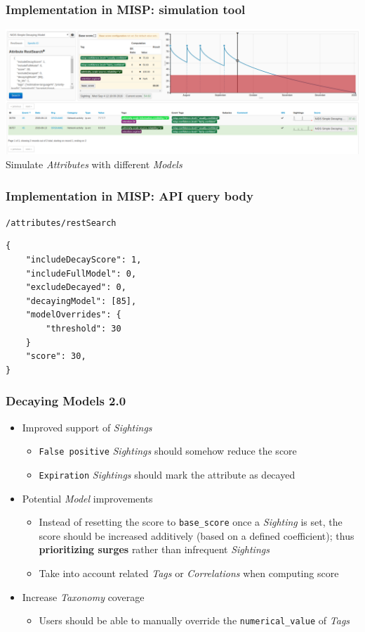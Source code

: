 \begin{frame}
    \frametitle{Implementation in MISP: simulation tool}
    \includegraphics[width=1.00\linewidth]{pics/decaying-simulation.png}
    Simulate \textit{Attributes} with different \textit{Models}
\end{frame}

\begin{frame}[fragile]
    \frametitle{Implementation in MISP: API query body}
    \texttt{/attributes/restSearch}
    \begin{lstlisting}
{
    "includeDecayScore": 1,
    "includeFullModel": 0,
    "excludeDecayed": 0,
    "decayingModel": [85],
    "modelOverrides": {
        "threshold": 30
    }
    "score": 30,
}
    \end{lstlisting}
\end{frame}

\begin{frame}
    \frametitle{Decaying Models 2.0}
    \begin{itemize}
        \item Improved support of \textit{Sightings}
        \begin{itemize}
            \item \texttt{False positive} \textit{Sightings} should somehow reduce the score
            \item \texttt{Expiration} \textit{Sightings} should mark the attribute as decayed
        \end{itemize}
        \item Potential \textit{Model} improvements
        \begin{itemize}
            \item Instead of resetting the score to \texttt{base\_score} once a \textit{Sighting} is set, the score should be increased additively (based on a defined coefficient); thus \textbf{prioritizing surges} rather than infrequent \textit{Sightings}
            \item Take into account related \textit{Tags} or \textit{Correlations} when computing score
        \end{itemize}
        \item Increase \textit{Taxonomy} coverage
        \begin{itemize}
            \item Users should be able to manually override the \texttt{numerical\_value} of \textit{Tags}
        \end{itemize}
    \end{itemize}
\end{frame}
